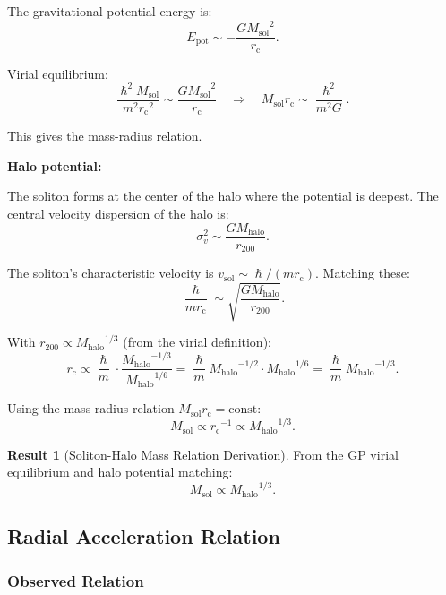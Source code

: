 \documentclass[11pt,a4paper]{article}
\newcommand{\hbar}{\ensuremath{\hslash}}
\newcommand{\Msol}{\ensuremath{M_{\mathrm{sol}}}}
\newcommand{\Mhalo}{\ensuremath{M_{\mathrm{halo}}}}
\newcommand{\rc}{\ensuremath{r_{\mathrm{c}}}}
\theoremstyle{definition}
\newtheorem{result}{Result}
\theoremstyle{remark}
\begin{document}
The gravitational potential energy is:
\begin{equation}
E_{\mathrm{pot}} \sim -\frac{G \Msol^2}{\rc}.
\end{equation}

Virial equilibrium:
\begin{equation}
\frac{\hbar^2 \Msol}{m^2 \rc^2} \sim \frac{G \Msol^2}{\rc} \quad \Rightarrow \quad \Msol \rc \sim \frac{\hbar^2}{m^2 G}.
\end{equation}

This gives the mass-radius relation.

\textbf{Halo potential:}

The soliton forms at the center of the halo where the potential is deepest. The central velocity dispersion of the halo is:
\begin{equation}
\sigma_v^2 \sim \frac{G \Mhalo}{r_{200}}.
\end{equation}

The soliton's characteristic velocity is $v_{\mathrm{sol}} \sim \hbar/(m\rc)$. Matching these:
\begin{equation}
\frac{\hbar}{m\rc} \sim \sqrt{\frac{G\Mhalo}{r_{200}}}.
\end{equation}

With $r_{200} \propto \Mhalo^{1/3}$ (from the virial definition):
\begin{equation}
\rc \propto \frac{\hbar}{m} \cdot \frac{\Mhalo^{-1/3}}{\Mhalo^{1/6}} = \frac{\hbar}{m} \Mhalo^{-1/2} \cdot \Mhalo^{1/6} = \frac{\hbar}{m}\Mhalo^{-1/3}.
\end{equation}

Using the mass-radius relation $\Msol \rc = \text{const}$:
\begin{equation}
\Msol \propto \rc^{-1} \propto \Mhalo^{1/3}.
\end{equation}

\begin{result}[Soliton-Halo Mass Relation Derivation]
From the GP virial equilibrium and halo potential matching:
\begin{equation}
\boxed{\Msol \propto \Mhalo^{1/3}.}
\end{equation}
\end{result}

\subsection{Radial Acceleration Relation}
\label{sec:RAR}

\subsubsection{Observed Relation}
\end{document}
